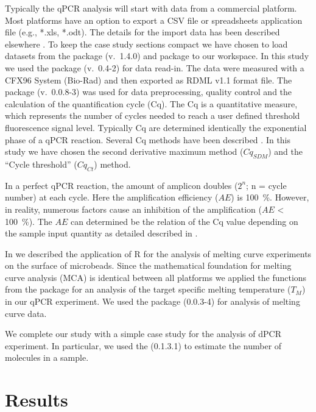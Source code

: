 Typically the qPCR analysis will start with data from a commercial platform. 
Most platforms have an option to export a CSV file or spreadsheets application 
file (e.g., *.xls, *.odt). The details for the import data has been described 
elsewhere \citep{RDCT2010c, rodiger_rkward_2012}. To keep the case study 
sections 
compact we have chosen to load datasets from the  package 
\citep{ritz_2008, spiess_2008} (v.~1.4.0) and  package to our 
workspace. In this study we used the  package (v.~0.4-2) for data 
read-in. The data were measured with a CFX96 System (Bio-Rad) and then exported 
as RDML v1.1 format file. The  package (v.~0.0.8-3) was used 
for data preprocessing, quality control and  the calculation of the 
quantification cycle (Cq). The Cq is a quantitative measure, which represents 
the number of cycles needed to reach a user defined threshold fluorescence 
signal level. Typically Cq are determined identically the exponential phase of 
a qPCR reaction. Several Cq methods have been described \citep{ruijter_2013}. 
In this study we have chosen the second derivative maximum method ($Cq_{SDM}$) 
and the ``Cycle threshold'' ($Cq_{Ct}$) method.

In a perfect qPCR reaction, the amount of amplicon doubles ($2^{n}$; n = cycle 
number) at each cycle. Here the amplification efficiency ($AE$) is 100~\%. 
However, in reality, numerous factors cause an inhibition of the amplification 
($AE$ < 100~\%).  The $AE$ can determined be the relation of the Cq value 
depending 
on the sample input quantity as detailed described in 
\citep{roediger_chippcr_2014}.

In \citet{roediger_RJ_2013} we described the application of R for the analysis 
of melting curve experiments on the surface of microbeads. Since the 
mathematical foundation for melting curve analysis (MCA) is identical between 
all platforms we applied the functions from the  package 
\citep{roediger_RJ_2013} for an analysis of the target specific melting 
temperature ($T_{M}$) in our qPCR experiment. We used the  
package (0.0.3-4) for analysis of melting curve data.

We complete our study with a simple case study for the analysis of dPCR 
experiment. 
In particular, we used the  (0.1.3.1) to estimate the number of 
molecules in a sample.

\section{Results}

